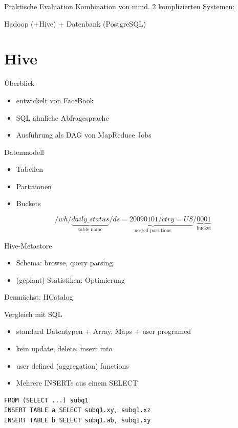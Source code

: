 \documentclass{beamer}
\begin{document}
\begin{frame}{Praktische Evaluation}
  Kombination von mind. 2 komplizierten Systemen:

  Hadoop (+Hive) + Datenbank (PostgreSQL)
\end{frame}

\section{Hive}

\begin{frame}{Überblick}
  \begin{itemize}
    \item entwickelt von FaceBook
    \item SQL ähnliche Abfragesprache
    \item Ausführung als DAG von MapReduce Jobs
  \end{itemize}
\end{frame}

\begin{frame}{Datenmodell}  
  \begin{itemize}
  \item Tabellen
  \item Partitionen
  \item Buckets
  \end{itemize}
\begin{displaymath}
  /wh/\underbrace{daily\_status}_{\text{table name}}/\underbrace{ds=20090101/ctry=US}_{\text{nested partitions}}/\underbrace{0001}_{\text{bucket}}
\end{displaymath}
\end{frame}

\begin{frame}{Hive-Metastore}
  \begin{itemize}
  \item Schema: browse, query parsing
  \item (geplant) Statistiken: Optimierung
  \end{itemize}
  Demnächst: HCatalog
\end{frame}

\begin{frame}[fragile]{Vergleich mit SQL}
  \begin{itemize}
    \item standard Datentypen + Array, Maps + user programed
    \item kein update, delete, insert into
    \item user defined (aggregation) functions
    \item Mehrere INSERTs aus einem SELECT
  \end{itemize}
\pause
\begin{verbatim}
FROM (SELECT ...) subq1
INSERT TABLE a SELECT subq1.xy, subq1.xz
INSERT TABLE b SELECT subq1.ab, subq1.xy
\end{verbatim}
\end{frame}
\end{document}

